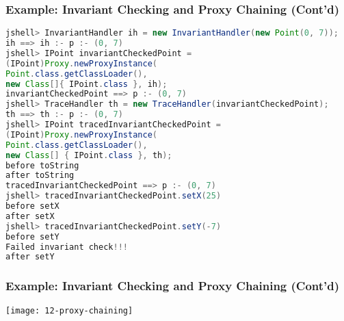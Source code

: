 \subsubsection{Example: Invariant Checking and Proxy Chaining (Cont'd)}

\begin{lstlisting}[language=Java]
jshell> InvariantHandler ih = new InvariantHandler(new Point(0, 7));
ih ==> ih :- p :- (0, 7)
jshell> IPoint invariantCheckedPoint =
(IPoint)Proxy.newProxyInstance(
Point.class.getClassLoader(),
new Class[]{ IPoint.class }, ih);
invariantCheckedPoint ==> p :- (0, 7)
jshell> TraceHandler th = new TraceHandler(invariantCheckedPoint);
th ==> th :- p :- (0, 7)
jshell> IPoint tracedInvariantCheckedPoint =
(IPoint)Proxy.newProxyInstance(
Point.class.getClassLoader(),
new Class[] { IPoint.class }, th);
before toString
after toString
tracedInvariantCheckedPoint ==> p :- (0, 7)
jshell> tracedInvariantCheckedPoint.setX(25)
before setX
after setX
jshell> tracedInvariantCheckedPoint.setY(-7)
before setY
Failed invariant check!!!
after setY
\end{lstlisting}

\subsubsection{Example: Invariant Checking and Proxy Chaining (Cont'd)}

\begin{center}
\texttt{[image: 12-proxy-chaining]}
\end{center}


 
